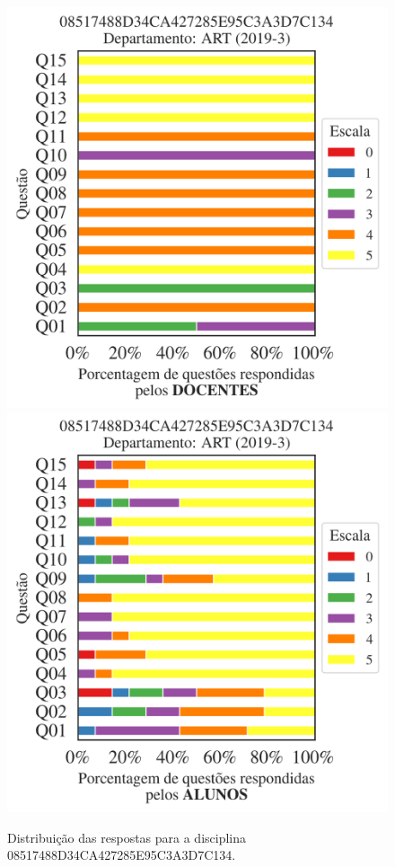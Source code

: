 \documentclass[a4paper,10pt]{article}
\begin{document}
\begin{figure}[h]
\centering
\includegraphics[width=0.485\linewidth]{analise_disciplina_departamento_ART_08517488D34CA427285E95C3A3D7C134_docentes.png}
\includegraphics[width=0.485\linewidth]{analise_disciplina_departamento_ART_08517488D34CA427285E95C3A3D7C134_alunos.png}
\caption{\label{fig:analise_geral_departamento}                Distribuição das respostas para a disciplina 08517488D34CA427285E95C3A3D7C134. }
\end{figure}
\end{document}
